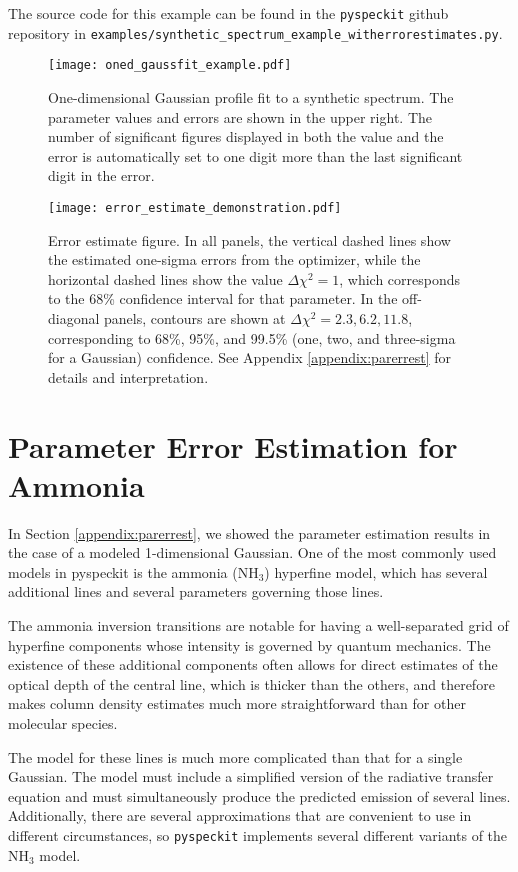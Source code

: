 \documentclass[twocolumn]{aastex62}
\newcommand{\pyspeckit}{\texttt{pyspeckit}\xspace}
\newcommand{\ammonia}{\ensuremath{\mathrm{NH}_3}\xspace}
\begin{document}
The source code for this example can be found in the \pyspeckit github
repository in \texttt{examples/synthetic\_spectrum\_example\_witherrorestimates.py}.

\begin{figure*}[!htp]
\texttt{[image: oned\_gaussfit\_example.pdf]}
\caption{One-dimensional Gaussian profile fit to a synthetic spectrum.
The parameter values and errors are shown in the upper right.  The number of
significant figures displayed in both the value and the error is automatically
set to one digit more than the last significant digit in the error.}
\label{fig:synthspecdemo}
\end{figure*}


\begin{figure*}[!htp]
\texttt{[image: error\_estimate\_demonstration.pdf]}
\caption{Error estimate figure.
In all panels, the vertical
dashed lines show the estimated one-sigma errors from the optimizer, while the
horizontal dashed lines show the value $\Delta\chi^2=1$, which corresponds to
the 68\% confidence interval for that parameter.
In the off-diagonal panels, contours are shown at $\Delta\chi^2=2.3,6.2,11.8$,
corresponding to 68\%, 95\%, and 99.5\% (one, two, and three-sigma for a
Gaussian) confidence.
See Appendix \ref{appendix:parerrest} for details and interpretation.}
\label{fig:parerrestdemo}
\end{figure*}


\section{Parameter Error Estimation for Ammonia}
\label{appendix:parerrestammonia}
In Section \ref{appendix:parerrest}, we showed the parameter estimation results
in the case of a modeled 1-dimensional Gaussian.  One of the most commonly used
models in pyspeckit is the ammonia (\ammonia) hyperfine model, which has several
additional lines and several parameters governing those lines.

The ammonia inversion transitions are notable for having a well-separated grid
of hyperfine components whose intensity is governed by quantum mechanics.
The existence of these additional components often allows for direct estimates
of the optical depth of the central line, which is thicker than the others,
and therefore makes column density estimates much more straightforward than
for other molecular species.

The model for these lines is much more complicated than that for a single Gaussian.
The model must include a simplified version of the radiative transfer equation
and must simultaneously produce the predicted emission of several lines.
Additionally, there are several approximations that are convenient to use
in different circumstances, so \pyspeckit implements several different
variants of the \ammonia model.
\end{document}

